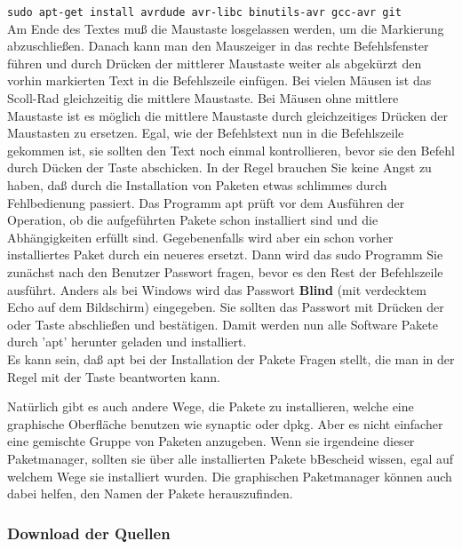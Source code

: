 \verb"sudo apt-get install avrdude avr-libc binutils-avr gcc-avr git"\\
Am Ende des Textes muß die Maustaste \LMB losgelassen werden,
um die Markierung abzuschließen.
Danach kann man den Mauszeiger in das rechte Befehlsfenster führen und
durch Drücken der mittlerer Maustaste {weiter als \MMB abgekürzt} den vorhin
markierten Text in die Befehlszeile einfügen.
Bei vielen Mäusen ist das Scoll-Rad gleichzeitig die mittlere Maustaste.
Bei Mäusen ohne mittlere Maustaste ist es möglich die mittlere Maustaste
durch gleichzeitiges Drücken der \LRMB Maustasten zu ersetzen.
Egal, wie der Befehlstext nun in die Befehlszeile gekommen ist,
sie sollten den Text noch einmal kontrollieren, bevor
sie den Befehl durch Dücken der \keys{\enter} Taste abschicken.
In der Regel brauchen Sie keine Angst zu haben, daß durch die Installation
von Paketen etwas schlimmes durch Fehlbedienung passiert.
Das Programm apt prüft vor dem Ausführen der Operation, ob die aufgeführten
Pakete schon installiert sind und die Abhängigkeiten erfüllt sind.
Gegebenenfalls wird aber ein schon vorher installiertes Paket durch ein neueres ersetzt.
Dann wird das sudo Programm Sie zunächst nach den Benutzer Passwort fragen,
bevor es den Rest der Befehlszeile ausführt.
Anders als bei Windows wird das Passwort \textbf{Blind} (mit verdecktem Echo auf dem Bildschirm)
eingegeben.
Sie sollten das Passwort mit Drücken der \keys{\enter} oder \keys{\return} Taste abschließen und bestätigen.
Damit werden nun alle Software Pakete durch 'apt' herunter geladen und installiert.\\
Es kann sein, daß apt bei der Installation der Pakete Fragen stellt,
die man in der Regel mit der Taste  beantworten kann.

Natürlich gibt es auch andere Wege, die Pakete zu installieren, welche eine graphische Oberfläche benutzen
wie synaptic oder dpkg. Aber es nicht einfacher eine gemischte Gruppe von Paketen anzugeben.
Wenn sie irgendeine dieser Paketmanager, sollten sie über alle installierten Pakete bBescheid wissen,
egal auf welchem Wege sie installiert wurden.
Die graphischen Paketmanager können auch dabei helfen, den Namen der Pakete herauszufinden.

\subsubsection{Download der Quellen}

